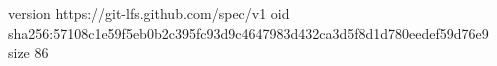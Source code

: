 version https://git-lfs.github.com/spec/v1
oid sha256:57108c1e59f5eb0b2c395fc93d9c4647983d432ca3d5f8d1d780eedef59d76e9
size 86
